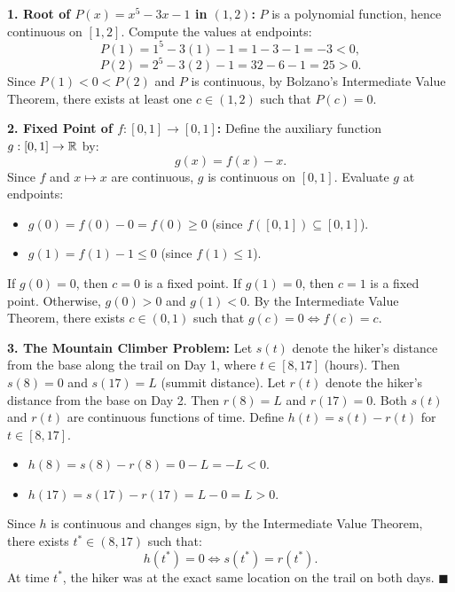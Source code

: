 \begin{solution}
\textbf{1. Root of $P(x) = x^5 - 3x - 1$ in $(1, 2)$:}
$P$ is a polynomial function, hence continuous on $[1, 2]$.
Compute the values at endpoints:
\[
P(1) = 1^5 - 3(1) - 1 = 1 - 3 - 1 = -3 < 0,
\]
\[
P(2) = 2^5 - 3(2) - 1 = 32 - 6 - 1 = 25 > 0.
\]
Since $P(1) < 0 < P(2)$ and $P$ is continuous, by Bolzano's Intermediate Value Theorem, there exists at least one $c \in (1, 2)$ such that $P(c) = 0$.

\textbf{2. Fixed Point of $f: [0, 1] \to [0, 1]$:}
Define the auxiliary function $g: [0, 1] \to \mathbb{R}$ by:
\[
g(x) = f(x) - x.
\]
Since $f$ and $x \mapsto x$ are continuous, $g$ is continuous on $[0, 1]$.
Evaluate $g$ at endpoints:
\begin{itemize}[leftmargin=1.5em,itemsep=1pt]
  \item $g(0) = f(0) - 0 = f(0) \ge 0$ (since $f([0, 1]) \subseteq [0, 1]$).
  \item $g(1) = f(1) - 1 \le 0$ (since $f(1) \le 1$).
\end{itemize}
If $g(0) = 0$, then $c = 0$ is a fixed point.
If $g(1) = 0$, then $c = 1$ is a fixed point.
Otherwise, $g(0) > 0$ and $g(1) < 0$.
By the Intermediate Value Theorem, there exists $c \in (0, 1)$ such that $g(c) = 0 \iff f(c) = c$.

\textbf{3. The Mountain Climber Problem:}
Let $s(t)$ denote the hiker's distance from the base along the trail on Day 1, where $t \in [8, 17]$ (hours).
Then $s(8) = 0$ and $s(17) = L$ (summit distance).
Let $r(t)$ denote the hiker's distance from the base on Day 2.
Then $r(8) = L$ and $r(17) = 0$.
Both $s(t)$ and $r(t)$ are continuous functions of time.
Define $h(t) = s(t) - r(t)$ for $t \in [8, 17]$.
\begin{itemize}[leftmargin=1.5em,itemsep=1pt]
  \item $h(8) = s(8) - r(8) = 0 - L = -L < 0$.
  \item $h(17) = s(17) - r(17) = L - 0 = L > 0$.
\end{itemize}
Since $h$ is continuous and changes sign, by the Intermediate Value Theorem, there exists $t^* \in (8, 17)$ such that:
\[
h(t^*) = 0 \iff s(t^*) = r(t^*).
\]
At time $t^*$, the hiker was at the exact same location on the trail on both days. \hfill $\blacksquare$
\end{solution}

